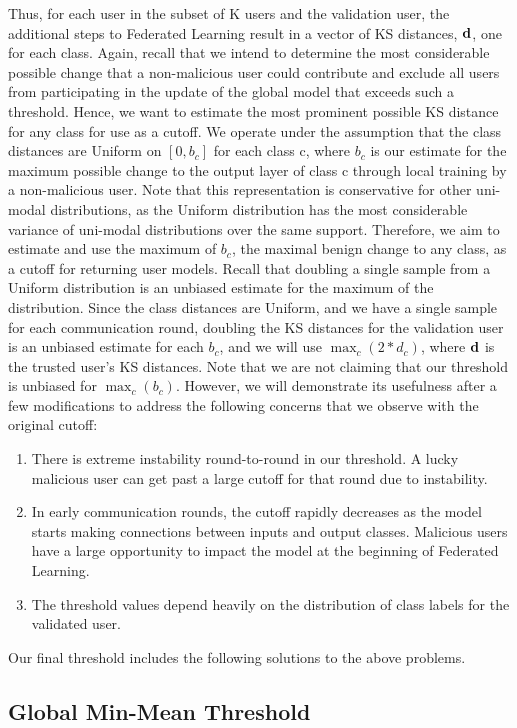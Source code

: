 \documentclass{article} %
\begin{document}
Thus, for each user in the subset of K users and the validation user, the additional steps to Federated Learning result in a vector of KS distances, ${\mathbf{d}}$, one for each class. Again, recall that we intend to determine the most considerable possible change that a non-malicious user could contribute and exclude all users from participating in the update of the global model that exceeds such a threshold. Hence, we want to estimate the most prominent possible KS distance for any class for use as a cutoff. We operate under the assumption that the class distances are Uniform on $[0, b_c]$ for each class c, where $b_c$ is our estimate for the maximum possible change to the output layer of class c through local training by a non-malicious user. Note that this representation is conservative for other uni-modal distributions, as the Uniform distribution has the most considerable variance of uni-modal distributions over the same support. Therefore, we aim to estimate and use the maximum of $b_c$, the maximal benign change to any class, as a cutoff for returning user models. Recall that doubling a single sample from a Uniform distribution is an unbiased estimate for the maximum of the distribution. Since the class distances are Uniform, and we have a single sample for each communication round, doubling the KS distances for the validation user is an unbiased estimate for each $b_c$, and we will use $\max_c (2 * d_c)$, where ${\mathbf{d}}$ is the trusted user's KS distances. Note that we are not claiming that our threshold is unbiased for $\max_c (b_c)$. However, we will demonstrate its usefulness after a few modifications to address the following concerns that we observe with the original cutoff:
\begin{enumerate}
    \item There is extreme instability round-to-round in our threshold. A lucky malicious user can get past a large cutoff for that round due to instability.
    \item In early communication rounds, the cutoff rapidly decreases as the model starts making connections between inputs and output classes. Malicious users have a large opportunity to impact the model at the beginning of Federated Learning.
    \item The threshold values depend heavily on the distribution of class labels for the validated user.
\end{enumerate}
Our final threshold includes the following solutions to the above problems.

%
\subsection{Global Min-Mean Threshold}
\end{document}
